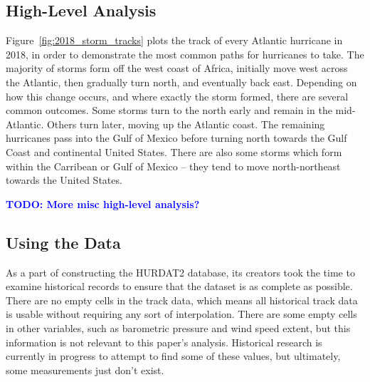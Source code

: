 \subsection{High-Level Analysis}

\par
Figure~\ref{fig:2018_storm_tracks} plots the track of every Atlantic hurricane in 2018, in order to demonstrate the most common paths for hurricanes to take.
The majority of storms form off the west coast of Africa, initially move west across the Atlantic, then gradually turn north, and eventually back east.
Depending on how this change occurs, and where exactly the storm formed, there are several common outcomes.
Some storms turn to the north early and remain in the mid-Atlantic.
Others turn later, moving up the Atlantic coast.
The remaining hurricanes pass into the Gulf of Mexico before turning north towards the Gulf Coast and continental United States.
There are also some storms which form within the Carribean or Gulf of Mexico -- they tend to move north-northeast towards the United States.

\par
\textcolor{blue}{\textbf{TODO: More misc high-level analysis?}}

\subsection{Using the Data}

\par
As a part of constructing the HURDAT2 database, its creators took the time to examine historical records to ensure that the dataset is as complete as possible.
There are no empty cells in the track data, which means all historical track data is usable without requiring any sort of interpolation.
There are some empty cells in other variables, such as barometric pressure and wind speed extent, but this information is not relevant to this paper's analysis.
Historical research is currently in progress to attempt to find some of these values, but ultimately, some measurements just don't exist.